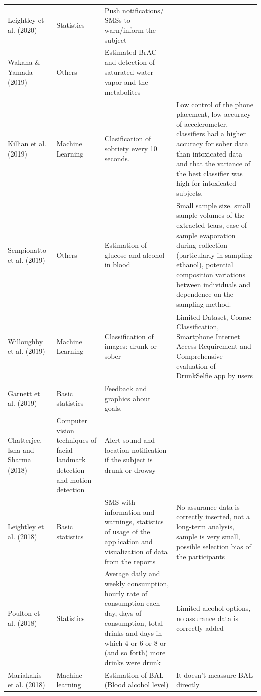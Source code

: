 \begin{longtable}{||p{} | p{} | p{} | p{}||}
Leightley et al. (2020) \cite{Leightley2020} & Statistics & Push notifications/ SMSs to warn/inform the subject & \multirow{2}{*}{-} \\ \cline{1-3}
Wakana \& Yamada (2019) \cite{Wakana2019} & Others & Estimated BrAC and detection of saturated water vapor and the metabolites &  \\ \hline
Killian et al. (2019) \cite{Killian201935} & Machine Learning & Clasification of sobriety every 10 seconds. & Low control of the phone placement, low accuracy of accelerometer, classifiers had a higher accuracy for sober data than intoxicated data and that the variance of the best classifier was high for intoxicated subjects.\\ \hline
Sempionatto et al. (2019) \cite{Sempionatto2019161} & Others & Estimation of glucose and alcohol in blood & Small sample size. small sample volumes of the extracted tears, ease of sample evaporation during collection (particularly in sampling ethanol), potential composition variations between individuals and dependence on the sampling method. \\ \hline
Willoughby et al. (2019) \cite{Willoughby2019496} & Machine Learning & Classification of images: drunk or sober & Limited Dataset, Coarse Classification, Smartphone Internet Access Requirement and Comprehensive evaluation of DrunkSelfie app by users \\ \hline
Garnett et al. (2019) \cite{Garnett2019296} & Basic statistics & Feedback and graphics about goals. & \multirow{2}{*}{-} \\ \cline{1-3}
Chatterjee, Isha and Sharma (2018) \cite{Chatterjee2018} & Computer vision techniques of facial landmark detection and motion detection & Alert sound and location notification if the subject is drunk or drowsy &  \\ \hline
Leightley et al. (2018) \cite{Leightley2018} & Basic statistics & SMS with information and warnings, statistics of usage of the application and visualization of data from the reports & No assurance data is correctly inserted, not a long-term analysis, sample is very small, possible selection bias of the participants \\ \hline
Poulton et al. (2018) \cite{Poulton201835} & Statistics & Average daily and weekly consumption, hourly rate of consumption each day, days of consumption, total drinks and days in which 4 or 6 or 8 or (and so forth) more drinks were drunk & Limited alcohol options, no assurance data is correctly added \\ \hline
Mariakakis et al. (2018) \cite{Mariakakis2018} & Machine learning & Estimation of BAL (Blood alcohol level) & It doesn't meassure BAL directly \\ \hline

\end{longtable}
